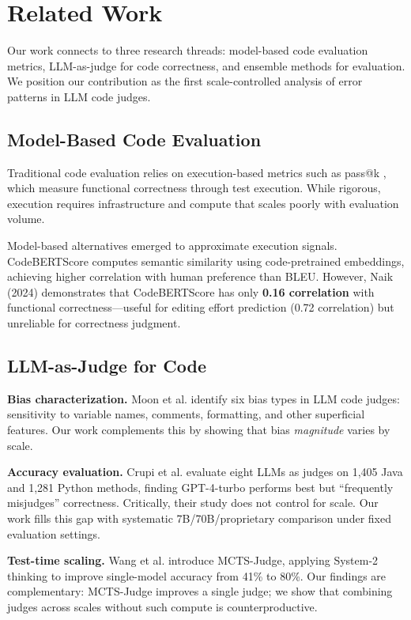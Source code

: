 \section{Related Work}

Our work connects to three research threads: model-based code evaluation metrics, LLM-as-judge for code correctness, and ensemble methods for evaluation. We position our contribution as the first scale-controlled analysis of error patterns in LLM code judges.

\subsection{Model-Based Code Evaluation}

Traditional code evaluation relies on execution-based metrics such as pass@k \cite{chen2021evaluating}, which measure functional correctness through test execution. While rigorous, execution requires infrastructure and compute that scales poorly with evaluation volume.

Model-based alternatives emerged to approximate execution signals. CodeBERTScore \cite{zhou2023codebertscore} computes semantic similarity using code-pretrained embeddings, achieving higher correlation with human preference than BLEU. However, Naik (2024) demonstrates that CodeBERTScore has only \textbf{0.16 correlation} with functional correctness---useful for editing effort prediction (0.72 correlation) but unreliable for correctness judgment.

\subsection{LLM-as-Judge for Code}

\textbf{Bias characterization.} Moon et al. \cite{moon2025biases} identify six bias types in LLM code judges: sensitivity to variable names, comments, formatting, and other superficial features. Our work complements this by showing that bias \textit{magnitude} varies by scale.

\textbf{Accuracy evaluation.} Crupi et al. \cite{crupi2025effectiveness} evaluate eight LLMs as judges on 1,405 Java and 1,281 Python methods, finding GPT-4-turbo performs best but ``frequently misjudges'' correctness. Critically, their study does not control for scale. Our work fills this gap with systematic 7B/70B/proprietary comparison under fixed evaluation settings.

\textbf{Test-time scaling.} Wang et al. \cite{wang2025mctsjudge} introduce MCTS-Judge, applying System-2 thinking to improve single-model accuracy from 41\% to 80\%. Our findings are complementary: MCTS-Judge improves a single judge; we show that combining judges across scales without such compute is counterproductive.

